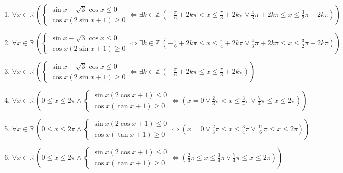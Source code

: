\documentclass[11pt,a4paper]{article}
\begin{document}
\begin{enumerate}
\item $\displaystyle \forall x \in \mathbb{R}\ \left( \begin{cases} \sin x - \sqrt{3}\cos x \le 0 \\ \cos x(2\sin x + 1) \ge 0 \end{cases} \iff \exists k \in \mathbb{Z}\ \left( -\frac{\pi}{6} + 2k\pi < x \le \frac{\pi}{3} + 2k\pi \lor \frac{4}{3}\pi + 2k\pi \le x \le \frac{3}{2}\pi + 2k\pi \right) \right)$
\item $\displaystyle \forall x \in \mathbb{R}\ \left( \begin{cases} \sin x - \sqrt{3}\cos x \le 0 \\ \cos x(2\sin x + 1) \ge 0 \end{cases} \iff \exists k \in \mathbb{Z}\ \left( -\frac{\pi}{6} + 2k\pi \le x \le \frac{\pi}{4} + 2k\pi \lor \frac{4}{3}\pi + 2k\pi \le x \le \frac{3}{2}\pi + 2k\pi \right) \right)$
\item $\displaystyle \forall x \in \mathbb{R}\ \left( \begin{cases} \sin x - \sqrt{3}\cos x \le 0 \\ \cos x(2\sin x + 1) \ge 0 \end{cases} \iff \exists k \in \mathbb{Z}\ \left( -\frac{\pi}{6} + 2k\pi \le x \le \frac{\pi}{3} + 2k\pi \right) \right)$
\item $\displaystyle \forall x \in \mathbb{R}\ \left( 0 \le x \le 2\pi \land \begin{cases} \sin x(2\cos x + 1) \le 0 \\ \cos x(\tan x + 1) \ge 0 \end{cases} \iff \left( x = 0 \lor \frac{2}{3}\pi < x \le \frac{3}{4}\pi \lor \frac{7}{4}\pi \le x \le 2\pi \right) \right)$
\item $\displaystyle \forall x \in \mathbb{R}\ \left( 0 \le x \le 2\pi \land \begin{cases} \sin x(2\cos x + 1) \le 0 \\ \cos x(\tan x + 1) \ge 0 \end{cases} \iff \left( x = 0 \lor \frac{2}{3}\pi \le x \le \frac{3}{4}\pi \lor \frac{11}{6}\pi \le x \le 2\pi \right) \right)$
\item $\displaystyle \forall x \in \mathbb{R}\ \left( 0 \le x \le 2\pi \land \begin{cases} \sin x(2\cos x + 1) \le 0 \\ \cos x(\tan x + 1) \ge 0 \end{cases} \iff \left( \frac{2}{3}\pi \le x \le \frac{3}{4}\pi \lor \frac{7}{4}\pi \le x \le 2\pi \right) \right)$

\end{enumerate}
\end{document}
